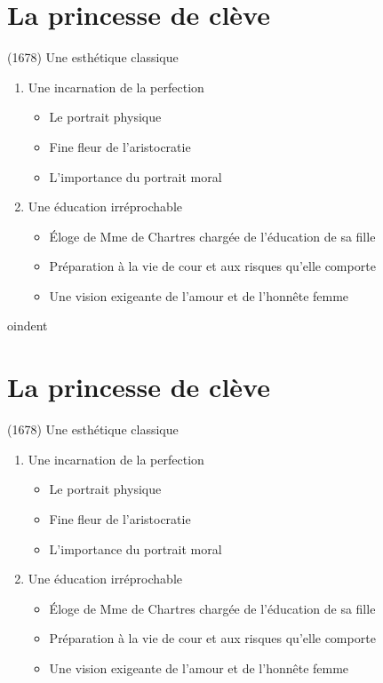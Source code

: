 \documentclass[12pt,a4paper]{article}
\begin{document}
\section*{La princesse de clève}
	(1678) Une esthétique classique
\begin{enumerate}
   \item Une incarnation de la perfection
   \begin{itemize}
     \item Le portrait physique
     \item Fine fleur de l'aristocratie
     \item L'importance du portrait moral
   \end{itemize}
   \item Une éducation irréprochable
   \begin{itemize}
       \item Éloge de Mme de Chartres chargée de l'éducation de sa fille
       \item Préparation à la vie de cour et aux risques qu'elle comporte
       \item Une vision exigeante de l'amour et de l'honnête femme
    \end{itemize}
\end{enumerate}

oindent\hrulefill

\section*{La princesse de clève}
	(1678) Une esthétique classique
\begin{enumerate}
   \item Une incarnation de la perfection
   \begin{itemize}
     \item Le portrait physique
     \item Fine fleur de l'aristocratie
     \item L'importance du portrait moral
   \end{itemize}
   \item Une éducation irréprochable
   \begin{itemize}
       \item Éloge de Mme de Chartres chargée de l'éducation de sa fille
       \item Préparation à la vie de cour et aux risques qu'elle comporte
       \item Une vision exigeante de l'amour et de l'honnête femme
    \end{itemize}
\end{enumerate}
\end{document}
